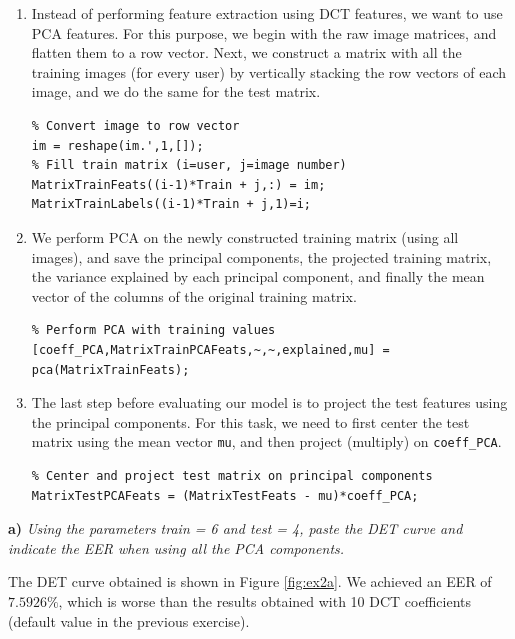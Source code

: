 \documentclass[11pt]{article}
\begin{document}
\begin{enumerate}
  \item Instead of performing feature extraction using DCT features, we want to use PCA features. For this purpose, we begin with the raw image matrices, and flatten them to a row vector. Next, we construct a matrix with all the training images (for every user) by vertically stacking the row vectors of each image, and we do the same for the test matrix.
  \begin{verbatim}
% Convert image to row vector
im = reshape(im.',1,[]);
% Fill train matrix (i=user, j=image number)
MatrixTrainFeats((i-1)*Train + j,:) = im;
MatrixTrainLabels((i-1)*Train + j,1)=i;
  \end{verbatim}
  \item We perform PCA on the newly constructed training matrix (using all images), and save the principal components, the projected training matrix, the variance explained by each principal component, and finally the mean vector of the columns of the original training matrix.
  \begin{verbatim}
% Perform PCA with training values
[coeff_PCA,MatrixTrainPCAFeats,~,~,explained,mu] = pca(MatrixTrainFeats);
  \end{verbatim}
\item The last step before evaluating our model is to project the test features using the principal components. For this task, we need to first center the test matrix using the mean vector \verb|mu|, and then project (multiply) on \verb|coeff_PCA|.
\begin{verbatim}
% Center and project test matrix on principal components
MatrixTestPCAFeats = (MatrixTestFeats - mu)*coeff_PCA;
\end{verbatim}
\end{enumerate}

\textbf{a)} \emph{Using the parameters train = 6 and test = 4, paste the DET curve and indicate the EER when using all the PCA components.}

The DET curve obtained is shown in Figure \ref{fig:ex2a}. We achieved an EER of $7.5926\%$, which is worse than the results obtained with 10 DCT coefficients (default value in the previous exercise).
\end{document}
